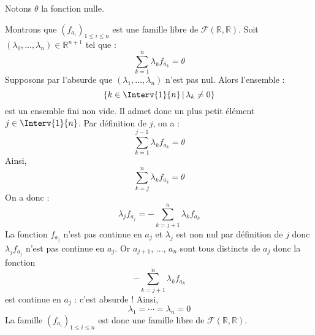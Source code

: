 \documentclass[a4paper,10pt]{report}
\begin{document}
\corr Notons $\theta$ la fonction nulle. 

\noindent Montrons que $(f_{a_i})_{1 \leq i \leq n}$ est une famille libre de $\mathcal{F}(\mathbb{R}, \mathbb{R})$. Soit $(\lambda_0, \ldots, \lambda_n) \in \mathbb{R}^{n+1}$ tel que :
$$ \sum_{k=1}^n \lambda_k f_{a_k} = \theta$$
Supposons par l'absurde que $(\lambda_1, \ldots, \lambda_n)$ n'est pas nul. Alors l'ensemble :
$$ \lbrace k \in \Interv{1}{n} \, \vert \, \lambda_k \neq 0 \rbrace$$
est un ensemble fini non vide. Il admet donc un plus petit élément $j \in \Interv{1}{n}$. Par définition de $j$, on a :
$$ \sum_{k=1}^{j-1} \lambda_k f_{a_k} = \theta$$
Ainsi,
$$ \sum_{k=j}^n \lambda_k f_{a_k} = \theta$$
On a donc :
$$ \lambda_j f_{a_j} = - \sum_{k=j+1}^n \lambda_k f_{a_k}$$
La fonction $f_{a_j}$ n'est pas continue en $a_j$ et $\lambda_j$ est non nul par définition de $j$ donc $\lambda_j f_{a_j}$ n'est pas continue en $a_j$. Or $a_{j+1}$, $\ldots$, $a_n$ sont tous distincts de $a_j$ donc la fonction 
$$ - \sum_{k=j+1}^n \lambda_k f_{a_k}$$
est continue en $a_j$ : c'est absurde ! Ainsi, 
$$ \lambda_1 = \cdots = \lambda_n = 0$$
La famille $(f_{a_i})_{1 \leq i \leq n}$ est donc une famille libre de $\mathcal{F}(\mathbb{R}, \mathbb{R})$.

\medskip
\end{document}
